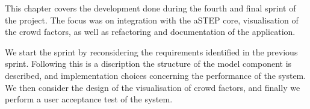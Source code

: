 This chapter covers the development done during the fourth and final sprint of the project. The focus was on integration with the aSTEP core, visualisation of the crowd factors, as well as refactoring and documentation of the application.

We start the sprint by reconsidering the requirements identified in the previous sprint. Following this is a discription the structure of the model component is described, and implementation choices concerning the performance of the system. We then consider the design of the visualisation of crowd factors, and finally we perform a user acceptance test of the system.